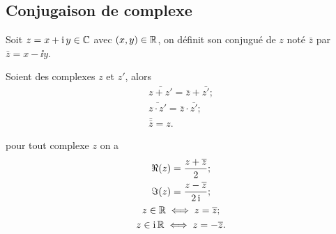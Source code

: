 \subsection{Conjugaison de complexe}
\label{subsec:conjugaisoncomplexe}
\begin{defdef}
  Soit $z=x+\operatorname{i} y \in \mathbb{C}$ avec $(x,y)\in \mathbb{R}$, on définit son conjugué de $z$ noté $\bar{z}$ par $\bar{z}=x- \ii y$.
\end{defdef}
\begin{prop}
  Soient des complexes $z$ et $z'$, alors
  \begin{gather}
    \bar{z+z'}=\bar{z} + \bar{z'}; \\
    \bar{z \cdot z'}=\bar{z} \cdot \bar{z'}; \\
    \bar{\bar{z}}=z.
  \end{gather}
\end{prop}
\begin{prop}
  pour tout complexe $z$ on a
  \begin{gather}
    \Re(z)=\frac{z+\overline{z}}{2};\\
    \Im(z)=\frac{z-\overline{z}}{2 \operatorname{i}};\\
    z \in \mathbb{R} \iff z=\overline{z};\\
    z \in \operatorname{i}\mathbb{R} \iff z=-\overline{z}.
  \end{gather}
\end{prop}
%
